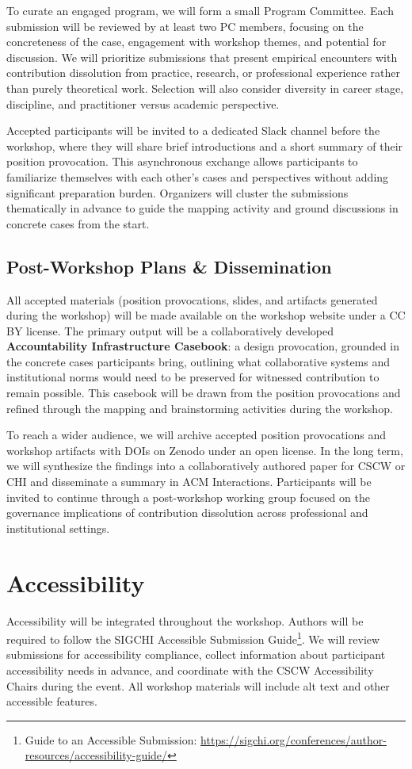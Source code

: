 \documentclass[manuscript,review]{acmart}
\begin{document}
To curate an engaged program, we will form a small Program Committee. Each submission will be reviewed by at least two PC members, focusing on the concreteness of the case, engagement with workshop themes, and potential for discussion. We will prioritize submissions that present empirical encounters with contribution dissolution from practice, research, or professional experience rather than purely theoretical work. Selection will also consider diversity in career stage, discipline, and practitioner versus academic perspective.

Accepted participants will be invited to a dedicated Slack channel before the workshop, where they will share brief introductions and a short summary of their position provocation. This asynchronous exchange allows participants to familiarize themselves with each other's cases and perspectives without adding significant preparation burden. Organizers will cluster the submissions thematically in advance to guide the mapping activity and ground discussions in concrete cases from the start.


\subsection{Post-Workshop Plans \& Dissemination}
All accepted materials (position provocations, slides, and artifacts generated during the workshop) will be made available on the workshop website under a CC BY license. The primary output will be a collaboratively developed \textbf{Accountability Infrastructure Casebook}: a design provocation, grounded in the concrete cases participants bring, outlining what collaborative systems and institutional norms would need to be preserved for witnessed contribution to remain possible. This casebook will be drawn from the position provocations and refined through the mapping and brainstorming activities during the workshop.

To reach a wider audience, we will archive accepted position provocations and workshop artifacts with DOIs on Zenodo under an open license. In the long term, we will synthesize the findings into a collaboratively authored paper for CSCW or CHI and disseminate a summary in ACM Interactions. Participants will be invited to continue through a post-workshop working group focused on the governance implications of contribution dissolution across professional and institutional settings.

\section{Accessibility}
Accessibility will be integrated throughout the workshop. Authors will be required to follow the SIGCHI Accessible Submission Guide\footnote{Guide to an Accessible Submission: \url{https://sigchi.org/conferences/author-resources/accessibility-guide/}}. We will review submissions for accessibility compliance, collect information about participant accessibility needs in advance, and coordinate with the CSCW Accessibility Chairs during the event. All workshop materials will include alt text and other accessible features.
\end{document}
